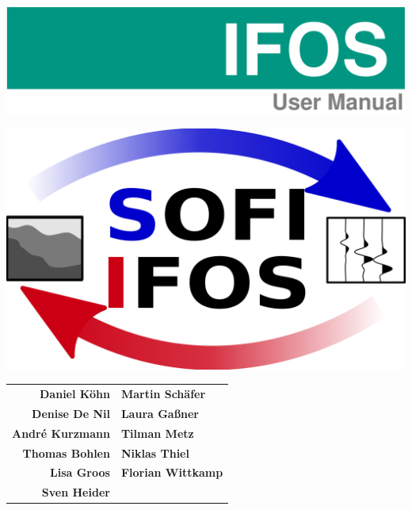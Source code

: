 \noindent\includegraphics[width=1.0\textwidth]{IFOS_title1.png}

\vspace{0.15 \textwidth}

\begin{center}
\includegraphics[width=.7\textwidth]{figures/logo_IFOS.png}

\vspace{0.1\textwidth}

\begin{tabular}{rl}
\textbf{Daniel K\"ohn} & \textbf{Martin Sch\"afer}\\
\textbf{Denise De Nil} & \textbf{Laura Ga\ss ner}\\
\textbf{Andr\'{e} Kurzmann} & \textbf{Tilman Metz}\\
\textbf{Thomas Bohlen} & \textbf{Niklas Thiel}\\
\textbf{Lisa Groos} & \textbf{Florian Wittkamp}\\
\textbf{Sven Heider} & \\
\end{tabular}

% 
% 
% 
% 
% 
% 
% 
% 
% 
% 
% 
% 
% 
% 


\end{center}
